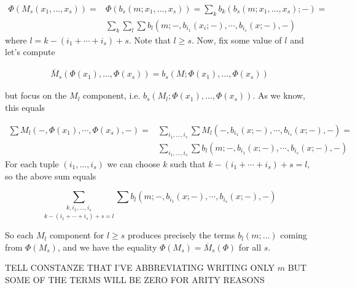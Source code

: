 \documentclass[twoside]{article}
\begin{document}
\begin{align*}
\Phi(M_s(x_1,\dots, x_s))=&\Phi(b_s(m;x_1,\dots, x_s))=\sum_k b_k(b_s(m;x_1,\dots, x_s);-)=\\
&\sum_k\sum_l\sum b_l(m; -, b_{i_1}(x_i;-),\cdots,b_{i_s}(x;-),-)
\end{align*}
where $l=k-(i_1+\cdots+i_s)+s$. Note that $l\geq s$. Now, fix some value of $l$ and let's compute

\begin{align*}
\overline{M}_s(\Phi(x_1),\dots, \Phi(x_s))=b_s(M;\Phi(x_1),\dots, \Phi(x_s))
\end{align*}

but focus on the $M_l$ component, i.e. $b_s(M_l;\Phi(x_1),\dots, \Phi(x_s))$. As we know, this equals

\begin{align*}
\sum M_l(-,\Phi(x_1),\cdots, \Phi(x_s),-)=&\sum_{i_1,\dots, i_s}\sum M_l(-,b_{i_1}(x;-),\cdots,b_{i_s}(x;-),-)=\\
&\sum_{i_1,\dots, i_s}\sum b_l(m;-,b_{i_1}(x;-),\cdots,b_{i_s}(x;-),-)
\end{align*}
For each tuple $(i_1,\dots, i_s)$ we can choose $k$ such that $k-(i_1+\cdots+i_s)+s=l$, so the above sum equals

$$\underset{k-(i_1+\cdots+i_s)+s=l}{\sum_{k,i_1,\dots, i_s}}\sum b_l(m;-,b_{i_1}(x;-),\cdots,b_{i_s}(x;-),-)$$

So each $M_l$ component for $l\geq s$ produces precisely the terms $b_l(m;\dots)$ coming from $\Phi(M_s)$, and we have the equality $\Phi(M_s)=\overline{M}_s(\Phi)$ for all $s$.


TELL CONSTANZE THAT I'VE ABBREVIATING WRITING ONLY $m$ BUT SOME OF THE TERMS WILL BE ZERO FOR ARITY REASONS
\end{document}
